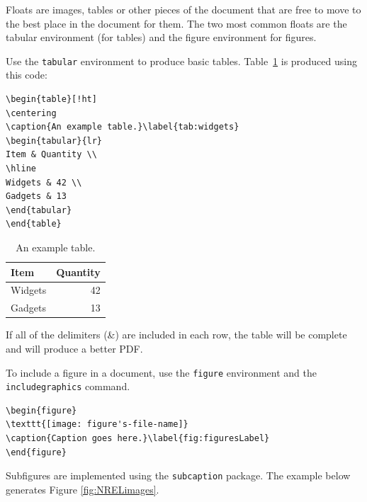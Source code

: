 Floats are images, tables or other pieces of the document that are free to move to the best place in the document for them. The two most common floats are the tabular environment (for tables) and the figure environment for figures.

Use the \texttt{tabular} environment to produce basic tables. Table~\ref{tab:widgets} is produced using this code: 

\begin{lstlisting}
\begin{table}[!ht]
\centering
\caption{An example table.}\label{tab:widgets}
\begin{tabular}{lr}
Item & Quantity \\
\hline
Widgets & 42 \\
Gadgets & 13
\end{tabular}
\end{table}
\end{lstlisting}

\begin{table}[!ht]
\centering
\caption{An example table.}\label{tab:widgets}
\begin{tabular}{lr}
Item & Quantity \\
\hline
Widgets & 42 \\
Gadgets & 13
\end{tabular}
\end{table}

If all of the delimiters (\&) are included in each row, the table will be complete and will produce a better PDF.

To include a figure in a document, use the \texttt{figure} environment and the \texttt{includegraphics} command.

\begin{lstlisting}
\begin{figure}
\texttt{[image: figure's-file-name]}
\caption{Caption goes here.}\label{fig:figuresLabel}
\end{figure}
\end{lstlisting}

Subfigures are implemented using the \texttt{subcaption} package. The example below generates Figure \ref{fig:NRELimages}.

